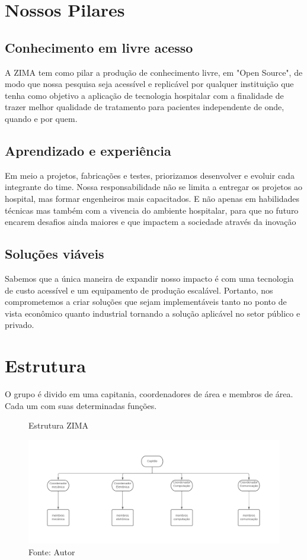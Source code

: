 \documentclass[../poliXuniversity_hospital_(USP)_report.tex]{subfiles}
\begin{document}
\chapter{Nossos Pilares}
\section{Conhecimento em livre acesso}
A ZIMA tem como pilar a produção de conhecimento livre, em "Open Source", de modo que nossa pesquisa seja acessível e replicável por qualquer instituição que tenha como objetivo a aplicação de tecnologia hospitalar com a finalidade de trazer melhor qualidade de tratamento para pacientes independente de onde, quando e por quem. 

\section{Aprendizado e experiência}
Em meio a projetos, fabricações e testes, priorizamos desenvolver e evoluir cada integrante do time. Nossa responsabilidade não se limita a entregar os projetos ao hospital, mas formar engenheiros mais capacitados. E não apenas em habilidades técnicas mas também com a vivencia do ambiente hospitalar, para que no futuro encarem desafios ainda maiores e que impactem a sociedade através da inovação

\section{Soluções viáveis}
Sabemos que a única maneira de expandir nosso impacto é com uma tecnologia de custo acessível e um equipamento de produção escalável. Portanto, nos comprometemos a criar soluções que sejam implementáveis tanto no ponto de vista econômico quanto industrial tornando a solução aplicável no setor público e privado.


\chapter{Estrutura}
O grupo é divido em uma capitania, coordenadores de área e membros de área. Cada um com suas determinadas funções.
\begin{figure}[h!]
\centering
    \caption{Estrutura ZIMA}
    \centering %
    \includegraphics[width=17cm]{images/diagrama_zima.pdf}
    \caption*{Fonte: Autor}
    \label{figura: Estrutura ZIMA}
\end{figure}
\end{document}
